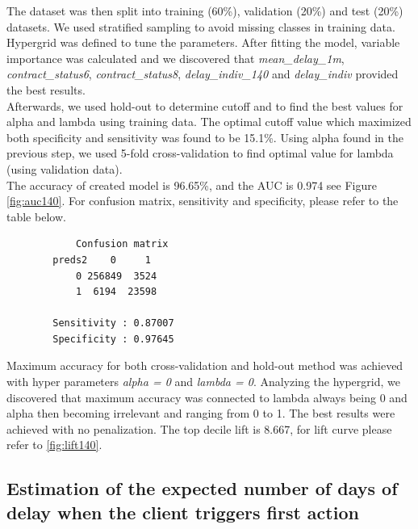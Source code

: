 \documentclass[
]{article}
\begin{document}
The dataset was then split into training (60\%), validation (20\%) and test (20\%) datasets. We used stratified sampling to avoid missing classes in training data.
Hypergrid was defined to tune the parameters. After fitting the model, variable importance was calculated and we discovered that \emph{mean\_delay\_1m}, \emph{contract\_status6}, \emph{contract\_status8}, \emph{delay\_indiv\_140} and \emph{delay\_indiv} provided the best results.\\
Afterwards, we used hold-out to determine cutoff and to find the best values for alpha and lambda using training data. The optimal cutoff value which maximized both specificity and sensitivity was found to be 15.1\%. Using alpha found in the previous step, we used 5-fold cross-validation to find optimal value for lambda (using validation data).\\
The accuracy of created model is 96.65\%, and the AUC is 0.974 see Figure \ref{fig:auc140}. For confusion matrix, sensitivity and specificity, please refer to the table below.

\begin{verbatim}
            Confusion matrix
        preds2    0     1
            0 256849  3524
            1  6194  23598
        
        Sensitivity : 0.87007         
        Specificity : 0.97645 
\end{verbatim}

Maximum accuracy for both cross-validation and hold-out method was achieved with hyper parameters \emph{alpha = 0} and \emph{lambda = 0}. Analyzing the hypergrid, we discovered that maximum accuracy was connected to lambda always being 0 and alpha then becoming irrelevant and ranging from 0 to 1. The best results were achieved with no penalization. The top decile lift is 8.667, for lift curve please refer to \ref{fig:lift140}.

\hypertarget{estimation-of-the-expected-number-of-days-of-delay-when-the-client-triggers-first-action}{%
\subsection{Estimation of the expected number of days of delay when the client triggers first action}\label{estimation-of-the-expected-number-of-days-of-delay-when-the-client-triggers-first-action}}
\end{document}
